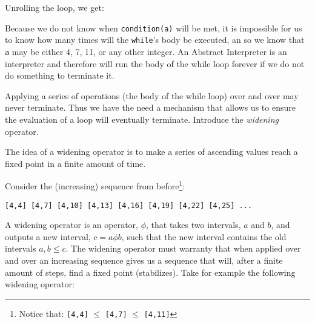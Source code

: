 \begin{Shaded}
\begin{Highlighting}[]
\OperatorTok{=} 
 
\OperatorTok{+=} 
\end{Highlighting}
\end{Shaded}

Unrolling the loop, we get:

\begin{Shaded}
\begin{Highlighting}[]
\OperatorTok{=}      

\OperatorTok{+=}   
\OperatorTok{+=}   
\OperatorTok{+=}   
\OperatorTok{+=}   
\end{Highlighting}
\end{Shaded}

Because we do not know when \texttt{condition(a)} will be met, it is
impossible for us to know how many times will the \texttt{while}'s body
be executed, an so we know that \texttt{a} may be either 4, 7, 11, or
any other integer. An Abstract Interpreter is an interpreter and
therefore will run the body of the while loop forever if we do not do
something to terminate it.

Applying a series of operations (the body of the while loop) over and
over may never terminate. Thus we have the need a mechanism that allows
us to ensure the evaluation of a loop will eventually terminate.
Introduce the \emph{widening} operator.

The idea of a widening operator is to make a series of ascending values
reach a fixed point in a finite amount of time.

Consider the (increasing) sequence from before\footnote{Notice that:
  \texttt{{[}4,4{]}} \(\le\) \texttt{{[}4,7{]}} \(\le\)
  \texttt{{[}4,11{]}}}:

\begin{verbatim}
[4,4] [4,7] [4,10] [4,13] [4,16] [4,19] [4,22] [4,25] ...
\end{verbatim}

A widening operator is an operator, \(\phi{}\), that takes two
intervals, \(a\) and \(b\), and outputs a new interval,
\(c = a \phi b\), such that the new interval contains the old intervals
\(a, b \le c\). The widening operator must warranty that when applied
over and over an increasing sequence gives us a sequence that will,
after a finite amount of steps, find a fixed point (stabilizes). Take
for example the following widening operator:

